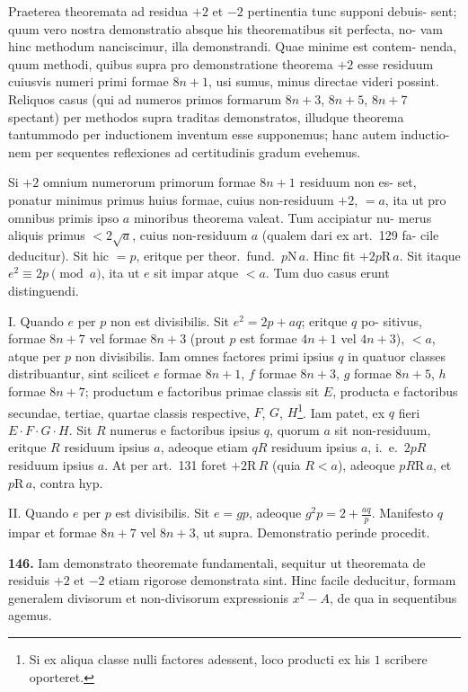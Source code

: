 \documentclass[12pt,a4paper]{article}
\newcommand{\R}{\mbox{R}}
\newcommand{\N}{\mbox{N}}
\begin{document}
Praeterea theoremata ad residua $+2$ et $-2$ pertinentia tunc supponi debuis-
sent; quum vero nostra demonstratio absque his theorematibus sit perfecta, no-
vam hinc methodum nanciscimur, illa demonstrandi. Quae minime est contem-
nenda, quum methodi, quibus supra pro demonstratione theorema $+2$ esse
residuum cuiusvis numeri primi formae $8n+1$, usi sumus, minus directae videri
possint. Reliquos casus (qui ad numeros primos formarum $8n+3$, $8n+5$,
$8n+7$ spectant) per methodos supra traditas demonstratos, illudque theorema
tantummodo per inductionem inventum esse supponemus; hanc autem inductio-
nem per sequentes reflexiones ad certitudinis gradum evehemus.

Si $+2$ omnium numerorum primorum formae $8n+1$ residuum non es-
set, ponatur minimus primus huius formae, cuius non-residuum $+2$, $= a$, ita
ut pro omnibus primis ipso $a$ minoribus theorema valeat. Tum accipiatur nu-
merus aliquis primus $< 2\sqrt{a}$, cuius non-residuum $a$ (qualem dari ex art.~129 fa-
cile deducitur). Sit hic $= p$, eritque per theor.\ fund.\ $p \N\, a$. Hinc fit $+2p \R\, a$.
Sit itaque $e^2 \equiv 2p \pmod{a}$, ita ut $e$ sit impar atque $< a$. Tum duo casus erunt
distinguendi.

I. Quando $e$ per $p$ non est divisibilis. Sit $e^2 = 2p + aq$; eritque $q$ po-
sitivus, formae $8n+7$ vel formae $8n+3$ (prout $p$ est formae $4n+1$ vel
$4n+3$), $< a$, atque per $p$ non divisibilis. Iam omnes factores primi ipsius $q$
in quatuor classes distribuantur, sint scilicet $e$ formae $8n+1$, $f$ formae $8n+3$,
$g$ formae $8n+5$, $h$ formae $8n+7$; productum e factoribus primae classis sit
$E$, producta e factoribus secundae, tertiae, quartae classis respective, $F$, $G$, $H$\footnote{Si ex aliqua classe nulli factores adessent, loco producti ex his $1$ scribere oporteret.}.
Iam patet, ex $q$ fieri $E \cdot F \cdot G \cdot H$. Sit $R$ numerus e factoribus ipsius $q$,
quorum $a$ sit non-residuum, eritque $R$ residuum ipsius $a$, adeoque etiam $qR$
residuum ipsius $a$, i.~e.\ $2pR$ residuum ipsius $a$. At per art.~131 foret
$+2 \R\, R$ (quia $R < a$), adeoque $pR \R\, a$, et $p \R\, a$, contra hyp.

II. Quando $e$ per $p$ est divisibilis. Sit $e = gp$, adeoque $g^2 p = 2 + \frac{aq}{p}$.
Manifesto $q$ impar et formae $8n+7$ vel $8n+3$, ut supra. Demonstratio
perinde procedit.

\textbf{146.}
Iam demonstrato theoremate fundamentali, sequitur ut theoremata de
residuis $+2$ et $-2$ etiam rigorose demonstrata sint. Hinc facile deducitur,
formam generalem divisorum et non-divisorum expressionis $x^2 - A$, de qua in
sequentibus agemus.
\end{document}

